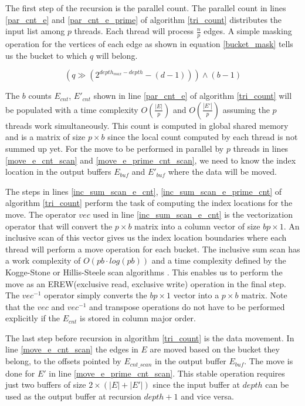 \documentclass[conference]{IEEEtran}
\begin{document}
The first step of the recursion is the parallel count. The parallel count in lines \ref{par_cnt_e} and \ref{par_cnt_e_prime} of algorithm \ref{tri_count} distributes the input list among $p$ threads. Each thread will process $\frac{n}{p}$ edges. A simple masking operation for the vertices of each edge as shown in equation \ref{bucket_mask} tells us the bucket to which $q$ will belong.

\begin{equation}
(q \gg (2^{depth_{max}-depth}-(d-1)))\land(b-1) \label{bucket_mask}
\end{equation}

The $b$ counts $E_{cnt}$, $E'_{cnt}$  shown in line \ref{par_cnt_e} of algorithm \ref{tri_count} will be populated with a time complexity $O(\frac{|E|}{p})$ and $O(\frac{|E'|}{p})$ assuming the $p$ threads work simultaneously. This count is computed in global shared memory and is a matrix of size $p \times b$ since the local count computed by each thread is not summed up yet. For the move to be performed in parallel by $p$ threads in lines \ref{move_e_cnt_scan} and \ref{move_e_prime_cnt_scan}, we need to know the index location in the output buffers $E_{buf}$ and $E'_{buf}$ where the data will be moved.

The steps in lines \ref{inc_sum_scan_e_cnt}, \ref{inc_sum_scan_e_prime_cnt} of algorithm \ref{tri_count} perform the task of computing the index locations for the move. The operator $vec$ used in line \ref{inc_sum_scan_e_cnt} is the vectorization operator\cite{b20} that will convert the $p \times b$ matrix into a column vector of size $bp \times 1$. An inclusive scan of this vector gives us the index location boundaries where each thread will perform a move operation for each bucket. The inclusive sum scan has a work complexity of $O(pb\cdot log(pb))$ and a time complexity defined by the Kogge-Stone or Hillis-Steele scan algorithms \cite{b14}. This enables us to perform the move as an EREW(exclusive read, exclusive write) operation in the final step. The $vec^{-1}$ operator simply converts the $bp \times 1$ vector into a $p \times b$ matrix. Note that the $vec$ and $vec^{-1}$ and transpose operations do not have to be performed explicitly if the $E_{cnt}$ is stored in column major order.

The last step before recursion in algorithm \ref{tri_count} is the data movement. In line \ref{move_e_cnt_scan} the edges in $E$ are moved based on the bucket they belong, to the offsets pointed by $E_{cnt\_scan}$ in the output buffer $E_{buf}$. The move is done for $E'$ in line \ref{move_e_prime_cnt_scan}. This stable operation requires just two buffers of size $2\times (|E|+|E'|)$ since the input buffer at $depth$ can be used as the output buffer at recursion $depth+1$ and vice versa.
\end{document}
